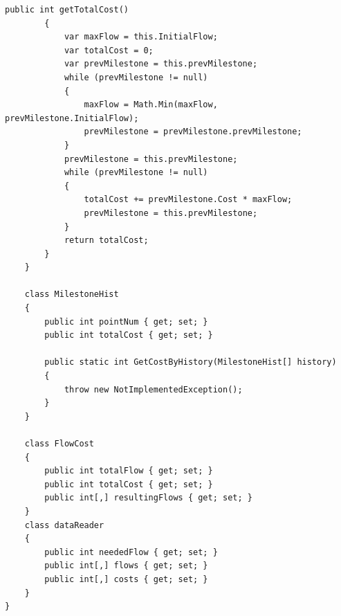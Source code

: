 \documentclass[a4paper,14pt,russian,ukrainian,oneside,final]{extreport}
\begin{document}
\begin{lstlisting}[style=csharpinlinestyle]
        public int getTotalCost()
        {
            var maxFlow = this.InitialFlow;
            var totalCost = 0;
            var prevMilestone = this.prevMilestone;
            while (prevMilestone != null)
            {
                maxFlow = Math.Min(maxFlow, prevMilestone.InitialFlow);
                prevMilestone = prevMilestone.prevMilestone;
            }
            prevMilestone = this.prevMilestone;
            while (prevMilestone != null)
            {
                totalCost += prevMilestone.Cost * maxFlow;
                prevMilestone = this.prevMilestone;
            }
            return totalCost;
        }
    }

    class MilestoneHist
    {
        public int pointNum { get; set; }
        public int totalCost { get; set; }

        public static int GetCostByHistory(MilestoneHist[] history)
        {
            throw new NotImplementedException();
        }
    }

    class FlowCost
    {
        public int totalFlow { get; set; }
        public int totalCost { get; set; }
        public int[,] resultingFlows { get; set; }
    }
    class dataReader
    {
        public int neededFlow { get; set; }
        public int[,] flows { get; set; }
        public int[,] costs { get; set; }
    }
}

\end{lstlisting}
\end{document}
